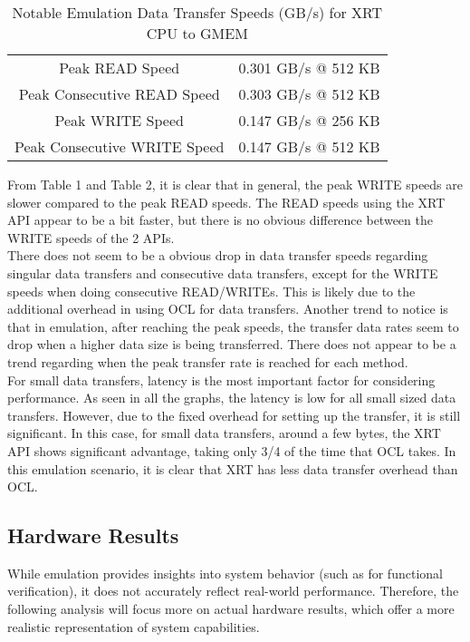 \begin{table}[H]
    \centering
    \begin{tabular}{c|c}
         Peak READ Speed & 0.301 GB/s @ 512 KB \\
         Peak Consecutive READ Speed & 0.303 GB/s @ 512 KB \\
         Peak WRITE Speed & 0.147 GB/s @ 256 KB \\
         Peak Consecutive WRITE Speed & 0.147 GB/s @ 512 KB \\
    \end{tabular}
    \caption{Notable Emulation Data Transfer Speeds (GB/s) for XRT CPU to GMEM}
    \label{tab:my_label}
\end{table}

From Table 1 and Table 2, it is clear that in general, the peak WRITE speeds are slower compared to the peak READ speeds. The READ speeds using the XRT API appear to be a bit faster, but there is no obvious difference between the WRITE speeds of the 2 APIs. \\

There does not seem to be a obvious drop in data transfer speeds regarding singular data transfers and consecutive data transfers, except for the WRITE speeds when doing consecutive READ/WRITEs. This is likely due to the additional overhead in using OCL for data transfers. Another trend to notice is that in emulation, after reaching the peak speeds, the transfer data rates seem to drop when a higher data size is being transferred. There does not appear to be a trend regarding when the peak transfer rate is reached for each method. \\

For small data transfers, latency is the most important factor for considering performance. As seen in all the graphs, the latency is low for all small sized data transfers. However, due to the fixed overhead for setting up the transfer, it is still significant. In this case, for small data transfers, around a few bytes, the XRT API shows significant advantage, taking only 3/4 of the time that OCL takes. In this emulation scenario, it is clear that XRT has less data transfer overhead than OCL. 

\subsection{Hardware Results}

While emulation provides insights into system behavior (such as for functional verification), it does not accurately reflect real-world performance. Therefore, the following analysis will focus more on actual hardware results, which offer a more realistic representation of system capabilities. \\

